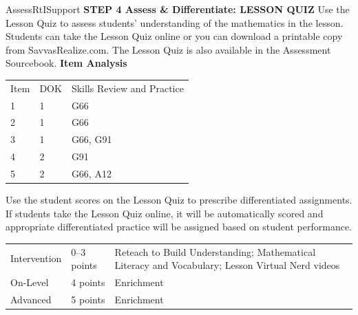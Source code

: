 \documentclass{article}
\newenvironment{te-addendum}[2]{}{}     %
\begin{document}
\begin{te-addendum}{Assess}{RtISupport}
\textbf{STEP 4 Assess & Differentiate: LESSON QUIZ}
Use the Lesson Quiz to assess students' understanding of the mathematics in the lesson.
Students can take the Lesson Quiz online or you can download a printable copy from SavvasRealize.com. The Lesson Quiz is also available in the Assessment Sourcebook.
\textbf{Item Analysis}
\begin{tabular}{lll}
Item & DOK & Skills Review and Practice \\
1 & 1 & G66 \\
2 & 1 & G66 \\
3 & 1 & G66, G91 \\
4 & 2 & G91 \\
5 & 2 & G66, A12 \\
\end{tabular}
Use the student scores on the Lesson Quiz to prescribe differentiated assignments.
If students take the Lesson Quiz online, it will be automatically scored and appropriate differentiated practice will be assigned based on student performance.
\begin{tabular}{lll}
Intervention & 0--3 points & Reteach to Build Understanding; Mathematical Literacy and Vocabulary; Lesson Virtual Nerd videos \\
On-Level & 4 points & Enrichment \\
Advanced & 5 points & Enrichment \\
\end{tabular}
\end{te-addendum}
\end{document}
